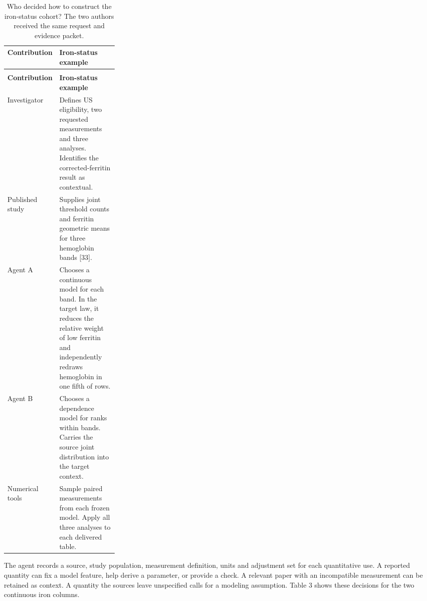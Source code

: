\documentclass[11pt,letterpaper]{article}
\begin{document}
\begin{xltabular}{\linewidth}{@{}>{\raggedright\arraybackslash}p{0.26\linewidth}>{\raggedright\arraybackslash}X@{}}

\caption{Who decided how to construct the iron-status cohort? The two authors received the same request and evidence packet.}\label{tab:2} \\

\toprule

\textbf{Contribution} & \textbf{Iron-status example} \\

\midrule

\endfirsthead

\\

\toprule

\textbf{Contribution} & \textbf{Iron-status example} \\

\midrule

\endhead

\bottomrule

\endfoot

Investigator & Defines US eligibility, two requested measurements and three analyses. Identifies the corrected-ferritin result as contextual. \\

Published study & Supplies joint threshold counts and ferritin geometric means for three hemoglobin bands [33]. \\

Agent A & Chooses a continuous model for each band. In the target law, it reduces the relative weight of low ferritin and independently redraws hemoglobin in one fifth of rows. \\

Agent B & Chooses a dependence model for ranks within bands. Carries the source joint distribution into the target context. \\

Numerical tools & Sample paired measurements from each frozen model. Apply all three analyses to each delivered table. \\

\end{xltabular}

\endgroup

The agent records a source, study population, measurement definition, units and adjustment set for each quantitative use. A reported quantity can fix a model feature, help derive a parameter, or provide a check. A relevant paper with an incompatible measurement can be retained as context. A quantity the sources leave unspecified calls for a modeling assumption. Table 3 shows these decisions for the two continuous iron columns.
\end{document}
